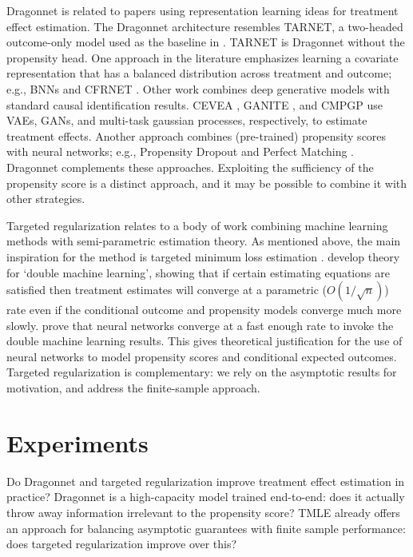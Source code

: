 \documentclass{article}
\begin{document}
Dragonnet is related to papers using representation learning ideas for treatment effect estimation.
The Dragonnet architecture resembles TARNET, a two-headed outcome-only model used as the baseline
in \citet{shalit2016estimating}. TARNET is Dragonnet without the propensity head.
One approach in the literature emphasizes learning a covariate representation that has a balanced distribution
across treatment and outcome;
e.g., BNNs \citep{Johanssonlearning2016} and CFRNET \citep{shalit2016estimating}.
Other work combines deep generative models with standard causal identification results.
CEVEA \citep{louizos2017causal}, GANITE \citep{Yoon2018GANITEEO}, and CMPGP \citep{AlaaCMPG2017} use VAEs, GANs, and multi-task gaussian processes, respectively, to estimate treatment effects.
Another approach combines (pre-trained) propensity scores with neural networks;
e.g., Propensity Dropout \citep{Alaadeep2017} and Perfect Matching \citep{Schwabperfect2018}.
Dragonnet complements these approaches. Exploiting the sufficiency of the propensity score
is a distinct approach, and it may be possible to combine it with other strategies.

Targeted regularization relates to a body of work combining machine learning
methods with semi-parametric estimation theory.
As mentioned above, the main inspiration for the method 
is targeted minimum loss estimation \cite{vanderLaan:Rose:2011}.
\citet{Chernozhukov:Chetverikov:Demirer:Duflo:Hansen:Newey:Robins:2017, Chernozhukov:Chetverikov:Demirer:Duflo:Hansen:Newey:2017}
develop theory for `double machine learning',
showing that if certain estimating equations are satisfied then
treatment estimates will converge at a parametric ($O(1/\sqrt{n})$) rate
even if the conditional outcome and propensity models converge much more slowly.
\citet{Farrell:Liang:Misra:2018} prove that neural networks converge at a fast enough
rate to invoke the double machine learning results.
This gives theoretical justification for the use of neural networks to model
propensity scores and conditional expected outcomes.
Targeted regularization is complementary:
we rely on the asymptotic results for motivation, and
address the finite-sample approach.

\section{Experiments}
\label{sec:experiments}
Do Dragonnet and targeted regularization improve treatment effect estimation in practice?
Dragonnet is a high-capacity model trained end-to-end:
does it actually throw away information irrelevant to the propensity score?
TMLE already offers an approach for balancing asymptotic guarantees with
finite sample performance: does targeted regularization improve over this?
\end{document}
